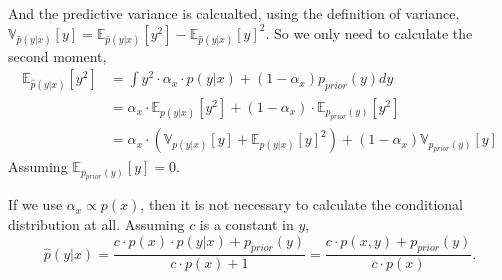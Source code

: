And the predictive variance is calcualted, using the definition of variance, $\mathbb{V}_{\hat p(y|x)}[y] =
\mathbb{E}_{\hat p(y|x)}[y^2] - \mathbb{E}_{\hat p(y|x)}[y]^2$. So we only need to calculate the second moment, 
\begin{align*}
    \mathbb{E}_{\hat p(y|x)}[y^2] &= \int y^2 \cdot \alpha_x \cdot p(y|x) + (1-\alpha_x) p_{prior}(y) dy\\
    &=\alpha_x \cdot \mathbb{E}_{p(y|x)}[y^2] +(1-\alpha_x) \cdot \mathbb{E}_{p_{prior}(y)}[y^2] \\
    &=\alpha_x \cdot(\mathbb{V}_{p(y|x)}[y]+\mathbb{E}_{p(y|x)}[y]^2) + (1-\alpha_x) \mathbb{V}_{p_{prior}(y)}[y]
\end{align*}
Assuming $\mathbb{E}_{p_{prior}(y)}[y] = 0$. 

\begin{note2}[Implementation]
    If we use $\alpha_x \propto p(x)$, then it is not necessary to calculate the conditional
    distribution at all. Assuming $c$ is a constant in $y$,
    $$\hat p(y|x) = \frac{c\cdot p(x)\cdot  p(y|x) + p_{prior}(y)}{c\cdot p(x)+1} = \frac{c \cdot p(x,y) + p_{prior}(y)}{c\cdot p(x)}.$$
\end{note2}

